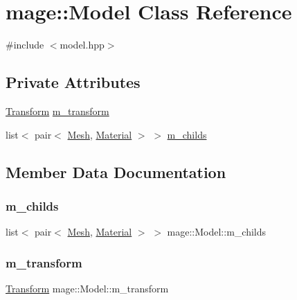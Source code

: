 \hypertarget{classmage_1_1_model}{}\section{mage\+:\+:Model Class Reference}
\label{classmage_1_1_model}


{\ttfamily \#include $<$model.\+hpp$>$}

\subsection*{Private Attributes}
\begin{DoxyCompactItemize}
\item 
\hyperlink{structmage_1_1_transform}{Transform} \hyperlink{classmage_1_1_model_a0339b956eb867b20b8df6823a24c2bd3}{m\+\_\+transform}
\item 
list$<$ pair$<$ \hyperlink{classmage_1_1_mesh}{Mesh}, \hyperlink{classmage_1_1_material}{Material} $>$ $>$ \hyperlink{classmage_1_1_model_a68bf32247cfe99678b385d1c684fb835}{m\+\_\+childs}
\end{DoxyCompactItemize}


\subsection{Member Data Documentation}
\hypertarget{classmage_1_1_model_a68bf32247cfe99678b385d1c684fb835}{}\label{classmage_1_1_model_a68bf32247cfe99678b385d1c684fb835} 
\subsubsection{\texorpdfstring{m\+\_\+childs}{m\_childs}}
{\footnotesize\ttfamily list$<$ pair$<$ \hyperlink{classmage_1_1_mesh}{Mesh}, \hyperlink{classmage_1_1_material}{Material} $>$ $>$ mage\+::\+Model\+::m\+\_\+childs\hspace{0.3cm}{\ttfamily [private]}}

\hypertarget{classmage_1_1_model_a0339b956eb867b20b8df6823a24c2bd3}{}\label{classmage_1_1_model_a0339b956eb867b20b8df6823a24c2bd3} 
\subsubsection{\texorpdfstring{m\+\_\+transform}{m\_transform}}
{\footnotesize\ttfamily \hyperlink{structmage_1_1_transform}{Transform} mage\+::\+Model\+::m\+\_\+transform\hspace{0.3cm}{\ttfamily [private]}}


